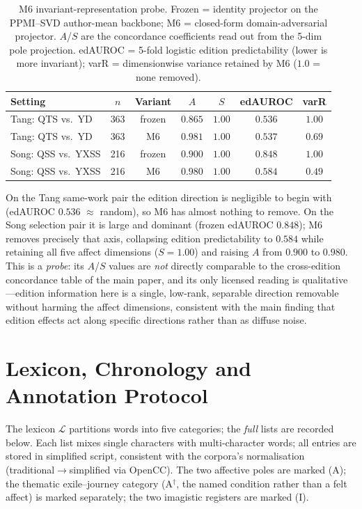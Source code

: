 \documentclass[11pt]{article}
\begin{document}
\begin{table}[H]
\centering\footnotesize
\caption{M6 invariant-representation probe. Frozen = identity projector on the
PPMI--SVD author-mean backbone; M6 = closed-form domain-adversarial projector.
$A$/$S$ are the concordance coefficients read out from the 5-dim pole projection.
edAUROC = 5-fold logistic edition predictability (lower is more invariant); varR =
dimensionwise variance retained by M6 ($1.0$ = none removed).}
\label{tab:m6}
\setlength{\tabcolsep}{3.2pt}
\begin{tabular}{lcccccc}
\toprule
Setting & $n$ & Variant & $A$ & $S$ & edAUROC & varR\\
\midrule
Tang: QTS vs.\ YD & 363 & frozen & $0.865$ & $1.00$ & $0.536$ & $1.00$\\
Tang: QTS vs.\ YD & 363 & M6 & $0.981$ & $1.00$ & $0.537$ & $0.69$\\
\midrule
Song: QSS vs.\ YXSS & 216 & frozen & $0.900$ & $1.00$ & $0.848$ & $1.00$\\
Song: QSS vs.\ YXSS & 216 & M6 & $0.980$ & $1.00$ & $0.584$ & $0.49$\\
\bottomrule
\end{tabular}
\end{table}

On the Tang same-work pair the edition direction is negligible to begin with (edAUROC
$0.536$ $\approx$ random), so M6 has almost nothing to remove. On the Song selection
pair it is large and dominant (frozen edAUROC $0.848$); M6 removes precisely that axis,
collapsing edition predictability to $0.584$ while retaining all five affect dimensions
($S{=}1.00$) and raising $A$ from $0.900$ to $0.980$. This is a \emph{probe}: its
$A$/$S$ values are \emph{not} directly comparable to the cross-edition concordance table of the main paper, and
its only licensed reading is qualitative---edition information here is a single,
low-rank, separable direction removable without harming the affect dimensions,
consistent with the main finding that edition effects act along specific directions
rather than as diffuse noise.

\section{Lexicon, Chronology and Annotation Protocol}
\label{app:lexicon}
The lexicon $\mathcal{L}$ partitions words into five categories; the \emph{full}
lists are recorded below. Each list mixes single characters with multi-character
words; all entries are stored in simplified script, consistent with the corpora's
normalisation (traditional$\to$simplified via OpenCC). The two affective poles
are marked (A); the thematic
exile--journey category (A$^\dagger$,
the named condition rather than a felt affect) is marked separately; the two imagistic
registers are marked (I).
\end{document}
